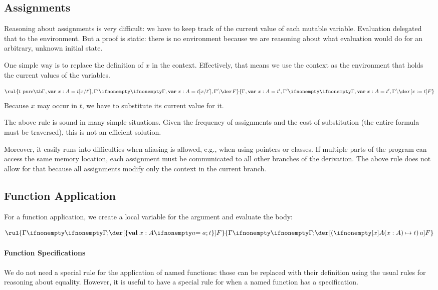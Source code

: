 
\subsection{Assignments}

Reasoning about assignments is very difficult: we have to keep track of the current value of each mutable variable.
Evaluation delegated that to the environment.
But a proof is static: there is no environment because we are reasoning about what evaluation would do for an arbitrary, unknown initial state.

One simple way is to replace the definition of $x$ in the context.
Effectively, that means we use the context as the environment that holds the current values of the variables.

\[\rul{t \text{ pure} \tb \iscons{}{\Gamma,\amval{x}{A}{t[x/t']},\Gamma'}{}{F}}
      {\iscons{}{\Gamma,\amval{x}{A}{t'},\Gamma'}{}{\abox{x:=t}{F}}}\]
Because $x$ may occur in $t$, we have to substitute its current value for it.

The above rule is sound in many simple situations.
Given the frequency of assignments and the cost of substitution (the entire formula must be traversed), this is not an efficient solution.

Moreover, it easily runs into difficulties when aliasing is allowed, e.g., when using pointers or classes.
If multiple parts of the program can access the same memory location, each assignment must be communicated to all other branches of the derivation.
The above rule does not allow for that because all assignments modify only the context in the current branch.

\subsection{Function Application}

For a function application, we create a local variable for the argument and evaluate the body:

\[\rul{\iscons{}{\Gamma}{}{\abox{\{\aval{x}{A}{a};t\}}{F}}}
      {\iscons{}{\Gamma}{}{\abox{(\alam[A]{x}{t})\,a}{F}}}
\]

\paragraph{Function Specifications}
We do not need a special rule for the application of named functions: those can be replaced with their definition using the usual rules for reasoning about equality.
However, it is useful to have a special rule for when a named function has a specification.

